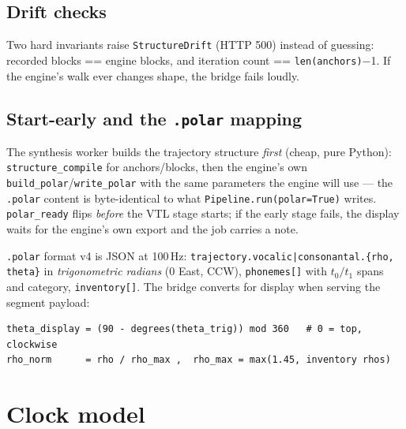 \documentclass[11pt,a4paper]{article}
\begin{document}
\subsection{Drift checks}

Two hard invariants raise \texttt{StructureDrift} (HTTP 500) instead of
guessing: recorded blocks == engine blocks, and iteration count ==
\texttt{len(anchors)}$-$1. If the engine's walk ever changes shape, the
bridge fails loudly.

\subsection{Start-early and the \texttt{.polar} mapping}

The synthesis worker builds the trajectory structure \emph{first}
(cheap, pure Python): \texttt{structure\_compile} for anchors/blocks,
then the engine's own \texttt{build\_polar}/\texttt{write\_polar} with
the same parameters the engine will use --- the \texttt{.polar} content
is byte-identical to what \texttt{Pipeline.run(polar=True)} writes.
\texttt{polar\_ready} flips \emph{before} the VTL stage starts; if the
early stage fails, the display waits for the engine's own export and the
job carries a note.

\texttt{.polar} format v4 is JSON at 100\,Hz:
\texttt{trajectory.vocalic|consonantal.\{rho, theta\}} in
\emph{trigonometric radians} (0 East, CCW), \texttt{phonemes[]} with
$t_0/t_1$ spans and category, \texttt{inventory[]}. The bridge converts
for display when serving the segment payload:

\begin{verbatim}
theta_display = (90 - degrees(theta_trig)) mod 360   # 0 = top, clockwise
rho_norm      = rho / rho_max ,  rho_max = max(1.45, inventory rhos)
\end{verbatim}

\section{Clock model}
\end{document}
